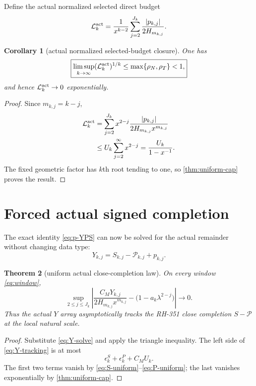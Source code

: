 \documentclass[11pt]{article}
\newtheorem{theorem}{Theorem}[section]
\newtheorem{corollary}[theorem]{Corollary}
\theoremstyle{remark}
\newcommand{\cP}{\mathcal P}
\newcommand{\cL}{\mathcal L}
\begin{document}
Define the actual normalized selected direct budget
\begin{equation}\label{eq:L-act}
 \cL_k^{\rm act}
 =\frac1{x^{k-2}}
 \sum_{j=2}^{J_k}\frac{|p_{k,j}|}{2H_{m_{k,j}}}.
\end{equation}

\begin{corollary}[actual normalized selected-budget closure]
\label{cor:L}
One has
\begin{equation}\label{eq:L-root}
 \boxed{
 \limsup_{k\to\infty}(\cL_k^{\rm act})^{1/k}
 \le\max\{\rho_N,\rho_T\}<1,}
\end{equation}
and hence $\cL_k^{\rm act}\to0$ exponentially.
\end{corollary}

\begin{proof}
Since $m_{k,j}=k-j$,
\begin{align*}
 \cL_k^{\rm act}
 &=\sum_{j=2}^{J_k}x^{2-j}
 \frac{|p_{k,j}|}{2H_{m_{k,j}}x^{m_{k,j}}}\\
 &\le U_k\sum_{j=2}^{\infty}x^{2-j}
 =\frac{U_k}{1-x^{-1}}.
\end{align*}
The fixed geometric factor has $k$th root tending to one, so
\cref{thm:uniform-cap} proves the result.
\end{proof}

\section{Forced actual signed completion}

The exact identity \eqref{eq:p-YPS} can now be solved for the actual
remainder without changing data type:
\begin{equation}\label{eq:Y-solve}
 Y_{k,j}=S_{k,j}-\cP_{k,j}+p_{k,j}.
\end{equation}

\begin{theorem}[uniform actual close-completion law]
\label{thm:Y-tracking}
On every window \eqref{eq:window},
\begin{equation}\label{eq:Y-tracking}
 \boxed{
 \sup_{2\le j\le J_k}
 \left|
 \frac{C_MY_{k,j}}{2H_{m_{k,j}}x^{m_{k,j}}}
 -\bigl(1-a_k\lambda^{2-j}\bigr)
 \right|\longrightarrow0.}
\end{equation}
Thus the actual $Y$ array asymptotically tracks the RH-351 close completion
$S-\cP$ at the local natural scale.
\end{theorem}

\begin{proof}
Substitute \eqref{eq:Y-solve} and apply the triangle inequality.  The
left side of \eqref{eq:Y-tracking} is at most
\[
 \epsilon_k^S+\epsilon_k^P+C_MU_k.
\]
The first two terms vanish by \eqref{eq:S-uniform}--\eqref{eq:P-uniform};
the last vanishes exponentially by \cref{thm:uniform-cap}.
\end{proof}
\end{document}
